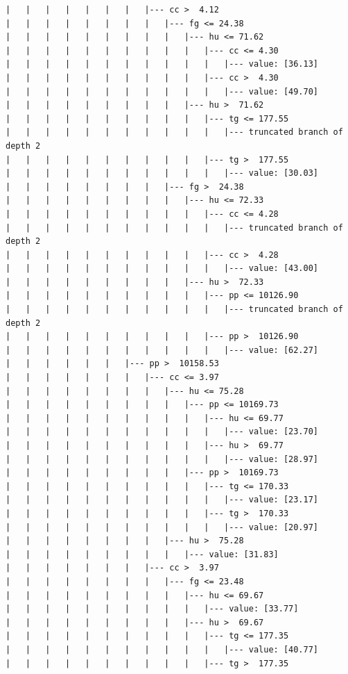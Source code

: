 \documentclass[UTF8, a4paper]{ctexart}
\begin{document}
\begin{lstlisting}
|   |   |   |   |   |   |   |--- cc >  4.12
|   |   |   |   |   |   |   |   |--- fg <= 24.38
|   |   |   |   |   |   |   |   |   |--- hu <= 71.62
|   |   |   |   |   |   |   |   |   |   |--- cc <= 4.30
|   |   |   |   |   |   |   |   |   |   |   |--- value: [36.13]
|   |   |   |   |   |   |   |   |   |   |--- cc >  4.30
|   |   |   |   |   |   |   |   |   |   |   |--- value: [49.70]
|   |   |   |   |   |   |   |   |   |--- hu >  71.62
|   |   |   |   |   |   |   |   |   |   |--- tg <= 177.55
|   |   |   |   |   |   |   |   |   |   |   |--- truncated branch of depth 2
|   |   |   |   |   |   |   |   |   |   |--- tg >  177.55
|   |   |   |   |   |   |   |   |   |   |   |--- value: [30.03]
|   |   |   |   |   |   |   |   |--- fg >  24.38
|   |   |   |   |   |   |   |   |   |--- hu <= 72.33
|   |   |   |   |   |   |   |   |   |   |--- cc <= 4.28
|   |   |   |   |   |   |   |   |   |   |   |--- truncated branch of depth 2
|   |   |   |   |   |   |   |   |   |   |--- cc >  4.28
|   |   |   |   |   |   |   |   |   |   |   |--- value: [43.00]
|   |   |   |   |   |   |   |   |   |--- hu >  72.33
|   |   |   |   |   |   |   |   |   |   |--- pp <= 10126.90
|   |   |   |   |   |   |   |   |   |   |   |--- truncated branch of depth 2
|   |   |   |   |   |   |   |   |   |   |--- pp >  10126.90
|   |   |   |   |   |   |   |   |   |   |   |--- value: [62.27]
|   |   |   |   |   |   |--- pp >  10158.53
|   |   |   |   |   |   |   |--- cc <= 3.97
|   |   |   |   |   |   |   |   |--- hu <= 75.28
|   |   |   |   |   |   |   |   |   |--- pp <= 10169.73
|   |   |   |   |   |   |   |   |   |   |--- hu <= 69.77
|   |   |   |   |   |   |   |   |   |   |   |--- value: [23.70]
|   |   |   |   |   |   |   |   |   |   |--- hu >  69.77
|   |   |   |   |   |   |   |   |   |   |   |--- value: [28.97]
|   |   |   |   |   |   |   |   |   |--- pp >  10169.73
|   |   |   |   |   |   |   |   |   |   |--- tg <= 170.33
|   |   |   |   |   |   |   |   |   |   |   |--- value: [23.17]
|   |   |   |   |   |   |   |   |   |   |--- tg >  170.33
|   |   |   |   |   |   |   |   |   |   |   |--- value: [20.97]
|   |   |   |   |   |   |   |   |--- hu >  75.28
|   |   |   |   |   |   |   |   |   |--- value: [31.83]
|   |   |   |   |   |   |   |--- cc >  3.97
|   |   |   |   |   |   |   |   |--- fg <= 23.48
|   |   |   |   |   |   |   |   |   |--- hu <= 69.67
|   |   |   |   |   |   |   |   |   |   |--- value: [33.77]
|   |   |   |   |   |   |   |   |   |--- hu >  69.67
|   |   |   |   |   |   |   |   |   |   |--- tg <= 177.35
|   |   |   |   |   |   |   |   |   |   |   |--- value: [40.77]
|   |   |   |   |   |   |   |   |   |   |--- tg >  177.35

\end{lstlisting}
\end{document}

